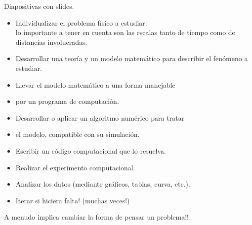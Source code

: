 \begin{frame}{Diapositivas con slides.}

  \begin{itemize}
    \item<1-> Individualizar el problema físico a estudiar: \\ \color{red} lo importante a tener en cuenta son las escalas tanto de tiempo como de distancias involucradas. \par 

      \item<2-> Desarrollar una \color{green} teoría y un modelo matemático  \color{black} para describir el fenómeno a estudiar.
      \item<3-> Llevar el modelo matemático a una forma manejable 
      \item<4-> por un programa de computación.
      \item<5-> Desarrollar o aplicar un algoritmo numérico para tratar 
      \item<6-> el modelo, compatible con su simulación.
      \item<7-> Escribir un código computacional que lo resuelva.
      \item<8-> Realizar el experimento computacional.
      \item<9-> Analizar los datos (mediante gráficos, tablas, curva, etc.).
      \item<10-> Iterar si hiciera falta! \color{green} (muchas veces!) \par  
  \end{itemize}
	 \color{red} A menudo implica cambiar la forma de pensar un problema!!
\end{frame}
